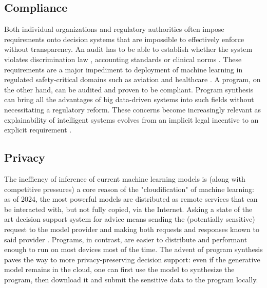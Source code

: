 \subsection{Compliance}

Both individual organizations and regulatory authorities often impose requirements onto decision systems that are impossible to effectively enforce without transparency. 
An audit has to be able to establish whether the system violates discrimination law \cite{hochDiscriminationSakeFairness2024,schererApplyingOldRules2019}, accounting standards \cite{julischComplianceDesignBridging2011} or clinical norms \cite{flodgrenExternalInspectionCompliance}.
These requirements are a major impediment to deployment of machine learning in regulated safety-critical domains such as aviation \cite{torensGuidelinesRegulatoryFramework2021,vidotQualificationAvionicSoftware2024} and healthcare \cite{granlundRegulatoryCompliantMLOpsOravizios2021}.
A program, on the other hand, can be audited and proven to be compliant. 
Program synthesis can bring all the advantages of big data-driven systems into such fields without necessitating a regulatory reform.
These concerns become increasingly relevant as explainability of intelligent systems evolves from an implicit legal incentive \cite{hackerExplainableAIContract2020} to an explicit requirement \cite{linardatosExplainableAiReview2020}.

\subsection{Privacy}

The ineffiency of inference of current machine learning models is (along with competitive pressures) a core reason of the "cloudification" of machine learning: as of 2024, the most powerful models \cite{achiamGpt4TechnicalReport2023} are distributed as remote services that can be interacted with, but not fully copied, via the Internet.
Asking a state of the art decision support system for advice means sending the (potentially sensitive) request to the model provider and making both requests and responses known to said provider \cite{openaiPrivacyPolicy2024}.
Programs, in contrast, are easier to distribute and performant enough to run on most devices most of the time.
The advent of program synthesis paves the way to more privacy-preserving decision support: even if the generative model remains in the cloud, one can first use the model to synthesize the program, then download it and submit the sensitive data to the program locally.

